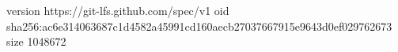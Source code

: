 version https://git-lfs.github.com/spec/v1
oid sha256:ac6e314063687c1d4582a45991cd160aecb27037667915e9643d0ef029762673
size 1048672
